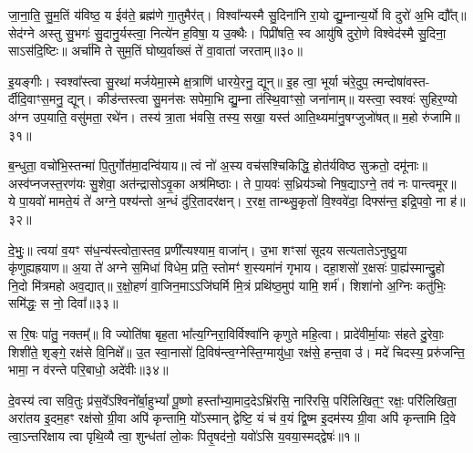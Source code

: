 जा॒ना॒ति॒ सु॒म॒तिं य॑विष्ठ॒ य ईव॑ते॒ ब्रह्म॑णे गा॒तुमैर॑त्। विश्वा᳚न्यस्मै सु॒दिना॑नि रा॒यो द्यु॒म्नान्य॒र्यो वि दुरो॑ अ॒भि द्यौ᳚त्॥ सेद॑ग्ने अस्तु सु॒भगः॑ सु॒दानु॒र्यस्त्वा॒ नित्ये॑न ह॒विषा॒ य उ॒क्थैः। पिप्री॑षति॒ स्व आयु॑षि दुरो॒णे विश्वेद॑स्मै सु॒दिना॒ सा\-ऽस॑दि॒ष्टिः॥ अर्चा॑मि ते सुम॒तिं घोष्य॒र्वाख्सं ते॑ वा॒वाता॑ जरताम्॥३०॥

इ॒यङ्गीः। स्वश्वा᳚स्त्वा सु॒रथा॑ मर्जयेमा॒स्मे क्ष॒त्राणि॑ धारये॒रनु॒ द्यून्॥ इ॒ह त्वा॒ भूर्या च॑रे॒दुप॒ त्मन्दोषा॑वस्त- र्दीदि॒वाꣳस॒मनु॒ द्यून्। कीड॑न्तस्त्वा सु॒मन॑सः सपेमा॒भि द्यु॒म्ना त॑स्थि॒वाꣳसो॒ जना॑नाम्॥ यस्त्वा॒ स्वश्वः॑ सुहिर॒ण्यो अ॑ग्न उप॒याति॒ वसु॑मता॒ रथे॑न। तस्य॑ त्रा॒ता भ॑वसि॒ तस्य॒ सखा॒ यस्त॑ आति॒थ्यमा॑नु॒षग्जुजो॑षत्॥ म॒हो रु॑जामि॥३१॥

ब॒न्धुता॒ वचो॑भि॒स्तन्मा॑ पि॒तुर्गोत॑मा॒दन्वि॑याय॥ त्वं नो॑ अ॒स्य वच॑सश्चिकिद्धि॒ होत॑र्यविष्ठ सुक्रतो॒ दमू॑नाः॥ अस्व॑प्नजस्त॒रण॑यः सु॒शेवा॒ अत॑न्द्रासो\-ऽवृ॒का अश्र॑मिष्ठाः। ते पा॒यवः॑ स॒ध्रिय॑ञ्चो निष॒द्या\-ऽग्ने॒ तव॑ नः पान्त्वमूर॥ ये पा॒यवो॑ मामते॒यं ते॑ अग्ने॒ पश्य॑न्तो अ॒न्धं दु॑रि॒तादर॑क्षन्। र॒रक्ष॒ तान्थ्सु॒कृतो॑ वि॒श्ववे॑दा॒ दिफ्स॑न्त॒ इद्रि॒पवो॒ ना ह॑॥३२॥

दे॒भुः॒॥ त्वया॑ व॒यꣳ स॑ध॒न्य॑स्त्वोता॒स्तव॒ प्रणी᳚त्यश्याम॒ वाजा॑न्। उ॒भा शꣳसा॑ सूदय सत्यताते\-ऽनुष्ठु॒या कृ॑णुह्यह्रयाण॥ अ॒या ते॑ अग्ने स॒मिधा॑ विधेम॒ प्रति॒ स्तोमꣳ॑ श॒स्यमा॑नं गृभाय। दहा॒शसो॑ र॒क्षसः॑ पा॒ह्य॑स्मान्द्रु॒हो नि॒दो मि॑त्रमहो अव॒द्यात्॥ र॒क्षो॒हणं॑ वा॒जिन॒मा\-ऽ\-ऽजि॑घर्मि मि॒त्रं प्रथि॑ष्ठ॒मुप॑ यामि॒ शर्म॑। शिशा॑नो अ॒ग्निः कतु॑भिः॒ समि॑द्धः॒ स नो॒ दिवा᳚॥३३॥

स रि॒षः पा॑तु॒ नक्तम्᳚॥ वि ज्योति॑षा बृह॒ता भा᳚त्य॒ग्निरा॒विर्विश्वा॑नि कृणुते महि॒त्वा। प्रादे॑वीर्मा॒याः स॑हते दु॒रेवाः॒ शिशी॑ते॒ शृङ्गे॒ रक्ष॑से वि॒निक्षे᳚॥ उ॒त स्वा॒नासो॑ दि॒विष॑न्त्व॒ग्नेस्ति॒ग्मायु॑धा॒ रक्ष॑से॒ हन्त॒वा उ॑। मदे॑ चिदस्य॒ प्ररु॑जन्ति॒ भामा॒ न व॑रन्ते परि॒बाधो॒ अदे॑वीः॥३४॥

{}

{}

\setcounter{anuvakam}{0}
दे॒वस्य॑ त्वा सवि॒तुः प्र॑स॒वे᳚\-ऽश्विनो᳚र्बा॒हु\-भ्यां᳚ पू॒ष्णो हस्ता᳚भ्या॒माद॒दे\-ऽभ्रि॑रसि॒ नारि॑रसि॒ परि॑लिखित॒ꣳ॒ रक्षः॒ परि॑लिखिता॒ अरा॑तय इ॒दम॒हꣳ रक्ष॑सो ग्री॒वा अपि॑ कृन्तामि॒ यो᳚\-ऽस्मान् द्वेष्टि॒ यं च॑ व॒यं द्वि॒ष्म इ॒दम॑स्य ग्री॒वा अपि॑ कृन्तामि दि॒वे त्वा॒\-ऽन्तरि॑क्षाय त्वा पृथि॒व्यै त्वा॒ शुन्ध॑तां लो॒कः पि॑तृ॒षद॑नो॒ यवो॑\-ऽसि य॒वया॒स्मद्द्वेषः॑॥१॥

